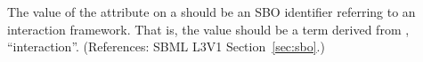 The value of the  attribute on a \Reaction should
be an SBO identifier referring to an interaction framework.  That
is, the value should be a term derived from \sbointeractionID,
``interaction''.  (References: SBML L3V1 Section~\ref{sec:sbo}.)

